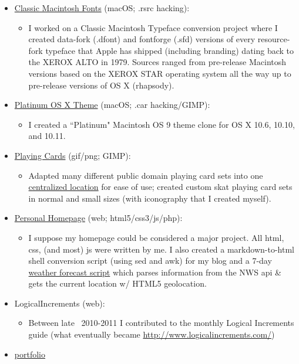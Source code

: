 \documentclass[11pt]{article}
\begin{document}
\begin{itemize}
\begin{itemize}
	\end{itemize}
	\item \href{https://github.com/JohnDDuncanIII/ClassicMacintoshFonts}{Classic Macintosh Fonts} (macOS; .rsrc hacking): 
	\begin{itemize}
	\item I worked on a Classic Macintosh Typeface conversion project where I created data-fork (.dfont) and fontforge (.sfd) versions of every resource-fork typeface that Apple has shipped (including branding) dating back to the XEROX ALTO in 1979. Sources ranged from pre-release Macintosh versions based on the XEROX STAR operating system all the way up to pre-release versions of OS X (rhapsody).
	\end{itemize}
	\item \href{https://github.com/JohnDDuncanIII/Platinum}{Platinum OS X Theme} (macOS; .car hacking/GIMP): 
	\begin{itemize}
	\item I created a ``Platinum" Macintosh OS 9 theme clone for OS X 10.6, 10.10, and 10.11.
	\end{itemize}
	\item \href{https://github.com/JohnDDuncanIII/PlayingCards}{Playing Cards} (gif/png; GIMP): 
	\begin{itemize}
	\item Adapted many different public domain playing card sets into one \href{http://cs.gettysburg.edu/~duncjo01/PlayingCards/}{centralized location} for ease of use; created custom skat playing card sets in normal and small sizes (with iconography that I created myself).
	\end{itemize}
	\item \href{https://github.com/JohnDDuncanIII/JohnDDuncanIII.github.io}{Personal Homepage} (web; html5/css3/js/php): 
	\begin{itemize}
	\item I suppose my homepage could be considered a major project. All html, css, (and most) js were written by me. I also created a markdown-to-html shell conversion script (using sed and awk) for my blog and a 7-day \href{http://cs.gettysburg.edu/~duncjo01/assets/scripts/weather.js}{weather forecast script} which parses information from the NWS api \& gets the current location w/ HTML5 geolocation.
	\end{itemize}
	\item LogicalIncrements (web): 
	\begin{itemize}
	\item Between late ~2010-2011 I contributed to the monthly Logical Increments guide (what eventually became \url{http://www.logicalincrements.com/})
	\end{itemize}
	\item \href{http://cs.gettysburg.edu/~duncjo01/assets/portfolio.html}{portfolio}
\end{itemize}
\end{document}
